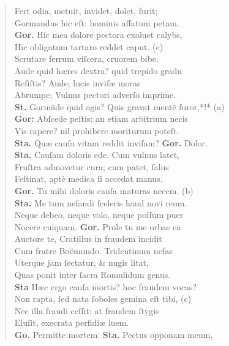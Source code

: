 \documentclass[a4paper,12pt]{article}
\begin{document}
\begin{verse}
Fert odia, metuit, invidet, dolet, furit;\\[0pt]
Gormandus hic eſt: hominis affatum petam.\\[0pt]
\textbf{Gor.} Hic mea dolore pectora exoluet calybs,\\[0pt]
Hic obligatum tartaro reddet caput. (c)\footnotemark\\[0pt]
Scrutare ferrum viſcera, cruorem bibe.\\[0pt]
Aude quid hæres dextra? quid trepido gradu\\[0pt]
Reſiſtis? Aude; lucis inviſæ moras\\[0pt]
Abrumpe; Vulnus pectori adverſo imprime.\\[0pt]
\textbf{St.} Gormãde quid agis? Quis gravat mentẽ furor,*!* (a)\footnotemark\\[0pt]
\textbf{Gor:} Abſcede peſtis: an etiam arbitrium necis\\[0pt]
Vis rapere? nil prohibere moriturum poteſt.\\[0pt]
\textbf{Sta.} Quæ cauſa vitam reddit inviſam? \textbf{Gor.} Dolor.\\[0pt]
\textbf{Sta.} Cauſam doloris ede. Cum vulnus latet,\\[0pt]
Fruſtra admovetur cura; cum patet, ſalus\\[0pt]
Feſtinat, aptè medica ſi accedat manus.\\[0pt]
\textbf{Gor.} Tu mihi doloris cauſa maturas necem. (b)\footnotemark\\[0pt]
\textbf{Sta.} Me tum nefandi ſceleris haud novi reum.\\[0pt]
Neque debeo, neque volo, neque poſſum puer\\[0pt]
Nocere cuiquam. \textbf{Gor.} Prole tu me orbas ea\\[0pt]
Auctore te, Cratillus in fraudem incidit\\[0pt]
Cum fratre Boëmundo. Tridentinum nefas\\[0pt]
Uterque jam ſectatur, \& nugis litat,\\[0pt]
Quas ponit inter ſacra Romulidum genus.\\[0pt]
\textbf{Sta} Hæc ergo cauſa mortis? hoc fraudem vocas?\\[0pt]
Non rapta, ſed nata ſoboles gemina eſt tibi, (c)\footnotemark\\[0pt]
Nec illa fraudi ceſſit; at fraudem ſtygis\\[0pt]
Eluſit, execrata perfidiæ luem.\\[0pt]
\textbf{Go.} Permitte mortem. \textbf{Sta.} Pectus opponam meum,\\[0pt]

\end{verse}
\end{document}
